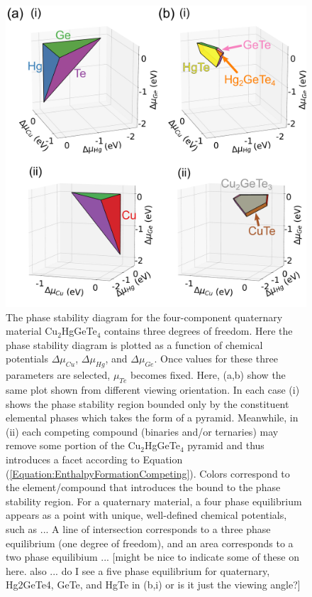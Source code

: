 \documentclass[%
 reprint,
 amsmath,amssymb,
 aps,
]{revtex4-1}
\def\blue#1{\textcolor[rgb]{0,0,1}{#1}}
\def\red#1{\textcolor[rgb]{1,0,0}{#1}}
\begin{document}
\begin{figure}[ht]
    \centering
    \includegraphics[scale=0.17]{PhaseDiagram_Cu2HgGeTe4_Facets_Labeled.pdf}
    \caption{The phase stability diagram for the  four-component quaternary material Cu$_2$HgGeTe$_4$ contains three degrees of freedom. Here the phase stability diagram is plotted as a function of chemical potentials $\Delta \mu_{Cu}$, $\Delta \mu_{Hg}$, and $\Delta \mu_{Ge}$. Once values for these three parameters are selected, $\mu_{Te}$ becomes fixed. Here, (a,b) show the same plot shown from different viewing orientation. In each case (i) shows the phase stability region bounded only by the constituent elemental phases which takes the form of a pyramid.  Meanwhile, in (ii) each competing compound (binaries and/or ternaries) may remove  some portion of the Cu$_2$HgGeTe$_4$ pyramid and thus introduces a facet according to Equation (\ref{Equation:EnthalpyFormationCompeting}).  Colors correspond to the element/compound that introduces the bound to the phase stability region. \red{For a quaternary material, a four phase equilibrium appears as a point with unique, well-defined chemical potentials, such as ... A line of intersection corresponds to a three phase equilibrium (one degree of freedom), and an area corresponds to a two phase equilibium ...} \blue{[might be nice to indicate some of these on here. also ... do I see a five phase equilibrium for quaternary, Hg2GeTe4, GeTe, and HgTe in (b,i) or is it just the viewing angle?]}}
    \label{Figure:PhaseStability_Schematic}
\end{figure}
\end{document}

